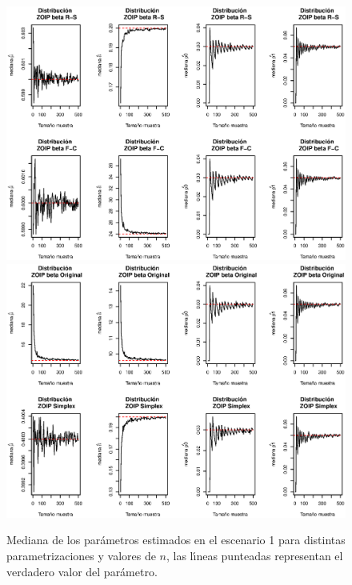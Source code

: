 \begin{figure}
	\begin{center}
		\includegraphics[scale=0.55]{Simulacion_RS_FC.eps}
		\quad
		\includegraphics[scale=0.55]{Simulacion_Ori_Sim.eps}	
		\caption{Mediana de los par\'{a}metros estimados en el escenario 1 para distintas parametrizaciones y valores de $n$, las l\'{\i}neas punteadas representan el verdadero valor del par\'{a}metro.}
		\label{Simu_1}
	\end{center}
\end{figure}

